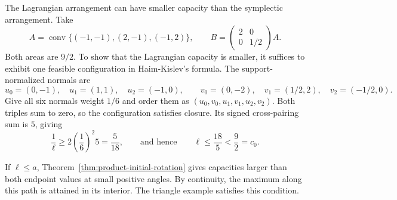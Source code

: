 \begin{example}\label{ex:product-endpoints}
The Lagrangian arrangement can have smaller capacity than the symplectic
arrangement. Take
\[
 A=\operatorname{conv}\{(-1,-1),(2,-1),(-1,2)\},\qquad
 B=\begin{pmatrix}2&0\\0&1/2\end{pmatrix}A.
\]
Both areas are $9/2$. To show that the Lagrangian capacity is smaller,
it suffices to exhibit one feasible configuration in Haim-Kislev's formula.
The support-normalized normals are
\[
 u_0=(0,-1),\quad u_1=(1,1),\quad u_2=(-1,0),\qquad
 v_0=(0,-2),\quad v_1=(1/2,2),\quad v_2=(-1/2,0).
\]
Give all six normals weight $1/6$ and order them as
$(u_0,v_0,u_1,v_1,u_2,v_2)$. Both triples sum to zero, so the configuration
satisfies closure. Its signed cross-pairing sum is $5$, giving
\[
 \frac1\ell\ge 2\left(\frac16\right)^2\!5=\frac5{18},
 \qquad\text{and hence}\qquad
 \ell\le\frac{18}{5}<\frac92=c_0.
\]
\end{example}

\begin{remark}
If $\ell\le a$, Theorem~\ref{thm:product-initial-rotation} gives capacities
larger than both endpoint values at small positive angles. By continuity,
the maximum along this path is attained in its interior. The triangle
example satisfies this condition.
\end{remark}
